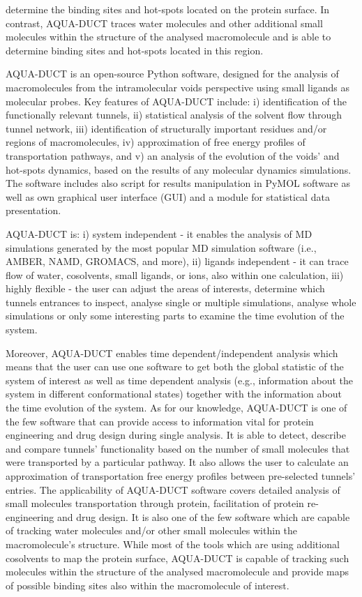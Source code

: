 \documentclass[9pt,tutorial]{livecoms}
\begin{document}
determine the binding sites and hot-spots located on the protein surface. In contrast, AQUA-DUCT traces water molecules and other additional small molecules within the structure of the analysed macromolecule and is able to determine binding sites and hot-spots located in this region. 

AQUA-DUCT is an open-source Python software, designed for the analysis of macromolecules from the intramolecular voids perspective using small ligands as molecular probes. Key features of AQUA-DUCT include: i) identification of the functionally relevant tunnels, ii) statistical analysis of the solvent flow through tunnel network, iii) identification of structurally important residues and/or regions of macromolecules, iv) approximation of free energy profiles of transportation pathways, and v) an analysis of the evolution of the voids’ and hot-spots dynamics, based on the results of any molecular dynamics simulations. The software includes also script for results manipulation in PyMOL \cite{Delano2002} software as well as own graphical user interface (GUI) and a module for statistical data presentation. 

AQUA-DUCT is:
\newline
i) system independent - it enables the analysis of MD simulations generated by the most popular MD simulation software (i.e., AMBER, NAMD, GROMACS, and more), 
\newline
ii) ligands independent - it can trace flow of water, cosolvents, small ligands, or ions, also within one calculation, 
\newline
iii) highly flexible - the user can adjust the areas of interests, determine which tunnels entrances to inspect, analyse single or multiple simulations, analyse whole simulations or only some interesting parts to examine the time evolution of the system. 

Moreover, AQUA-DUCT enables time dependent/independent analysis which means that the user can use one software to get both the global statistic of the system of interest as well as time dependent analysis (e.g., information about the system in different conformational states) together with the information about the time evolution of the system. As for our knowledge, AQUA-DUCT is one of the few software that can provide access to information vital for protein engineering and drug design during single analysis. It is able to detect, describe and compare tunnels' functionality based on the number of small molecules that were transported by a particular pathway. It also allows the user to calculate an approximation of transportation free energy profiles between pre-selected tunnels’ entries. The applicability of AQUA-DUCT software covers detailed analysis of small molecules transportation through protein, facilitation of protein re-engineering and drug design. It is also one of the few software which are capable of tracking water molecules and/or other small molecules within the macromolecule's structure. While most of the tools which are using additional cosolvents to map the protein surface, AQUA-DUCT is capable of tracking such molecules within the structure of the analysed macromolecule and provide maps of possible binding sites also within the macromolecule of interest. 
\end{document}
